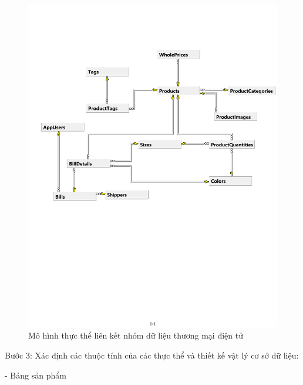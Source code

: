 \begin{center}
    \begin{figure}[h]
    \begin{center}
     \includegraphics[scale=0.7]{image/E-REcomerce.pdf}
    \end{center}
    \caption{Mô hình thực thể liên kết nhóm dữ liệu thương mại điện tử}
    \label{refhinh3_12}
    \end{figure}
\end{center}
Bước 3: Xác định các thuộc tính của các thực thể và thiết kế vật lý cơ sở dữ liệu:
\par
- Bảng sản phẩm
